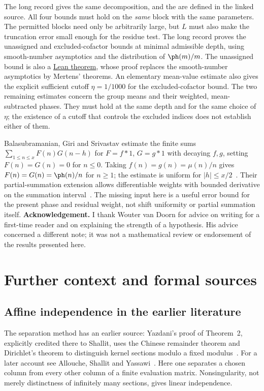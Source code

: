 \documentclass[11pt]{article}
\newcommand{\latecommit}{168bf6727758f918a430ef056a1c93d3160b53a6}
\newcommand{\laterepobase}{https://github.com/wcook04/plectis-erdos/blob/\latecommit}
\begin{document}
The long record gives the same decomposition, and the
are defined in the linked source. All four bounds must hold on the \emph{same} block
with the same parameters. The permitted blocks need only be arbitrarily
large, but $L$ must also make the truncation error small enough for the
residue test. The long record proves the unassigned and excluded-cofactor
bounds at minimal admissible depth, using smooth-number asymptotics and
the distribution of $\ph(m)/m$. The unassigned bound is also a
\href{\laterepobase/lean/ErdosProblems/Erdos249/PaperCompleteR21/UnassignedSmoothCount.lean\#L556}{Lean theorem},
whose proof replaces the smooth-number asymptotics by Mertens' theorems.
An elementary mean-value estimate also
gives the explicit sufficient cutoff $\eta=1/1000$ for the
excluded-cofactor bound. The two remaining estimates concern the group
means and their weighted, mean-subtracted phases. They must hold at the
same depth and for the same choice of $\eta$; the existence of a cutoff
that controls the excluded indices does not establish either of them.

Balasubramanian, Giri and Srivastav estimate the finite sums
$\sum_{1\le n\le x}F(n)G(n-h)$ for $F=f*1$, $G=g*1$ with decaying
$f,g$, setting $F(n)=G(n)=0$ for $n\le0$. Taking
$f(n)=g(n)=\mu(n)/n$ gives $F(n)=G(n)=\ph(n)/n$ for $n\ge1$;
the estimate is uniform for $|h|\le x/2$~\cite[Thm.~2.2]{bgs2016}.
Their partial-summation extension allows differentiable weights with
bounded derivative on the summation interval~\cite[Rem.~2.9]{bgs2016}.
The missing input here is a useful error bound for the present phase
and residual weight, not shift uniformity or partial summation itself.
\medskip
\noindent\textbf{Acknowledgement.} I thank Wouter van Doorn for advice on
writing for a first-time reader and on explaining the strength of a
hypothesis. His advice concerned a different note; it was not a mathematical
review or endorsement of the results presented here.

\appendix
\section{Further context and formal sources}\label{app:sources}

\subsection*{Affine independence in the earlier literature}
The separation method has an earlier source: Yazdani's proof of
Theorem~2, explicitly credited there to Shallit, uses the Chinese remainder
theorem and Dirichlet's theorem to distinguish kernel sections modulo a
fixed modulus~\cite[Thm.~2 and proof, pp.~652--653]{yazdani2001}.
For a later account see Allouche, Shallit and Yassawi~\cite[Thm.~3 and
Rem.~7]{allouche-shallit-yassawi}. Here one separates a chosen column
from every other column of a finite evaluation matrix. Nonsingularity,
not merely distinctness of infinitely many sections, gives linear
independence.
\end{document}
